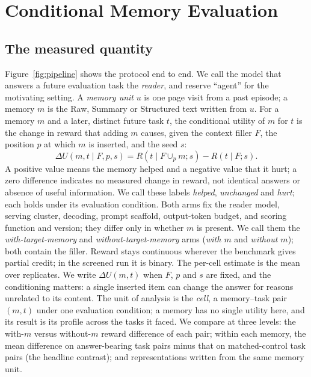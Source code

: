 \section{Conditional Memory Evaluation}
\label{sec:method}

\subsection{The measured quantity}
Figure~\ref{fig:pipeline} shows the protocol end to end. We call the model that answers a future evaluation task the \emph{reader},
and reserve ``agent'' for the motivating setting. A \emph{memory unit} $u$ is one
page visit from a past episode; a memory $m$ is the Raw, Summary or Structured
text written from $u$. For a memory $m$ and a later, distinct future task $t$, the conditional utility of
$m$ for $t$ is the change in reward that adding $m$ causes, given the context
filler $F$, the position $p$ at which $m$ is inserted, and the seed $s$:
\begin{equation}
\label{eq:du}
  \Delta U(m, t \mid F, p, s) = R(t \mid F \cup_p m; s) - R(t \mid F; s).
\end{equation}
A positive value means the memory helped and a negative value that it hurt; a
zero difference indicates no measured change in reward, not identical answers
or absence of useful information. We call these labels \emph{helped},
\emph{unchanged} and \emph{hurt}; each holds under its evaluation condition. Both arms fix the reader model, serving
cluster, decoding, prompt scaffold, output-token budget, and scoring function
and version; they differ only in whether $m$ is present. We call them the
\emph{with-target-memory} and \emph{without-target-memory} arms (\emph{with $m$} and
\emph{without $m$}); both contain the filler. Reward stays continuous
wherever the benchmark gives partial credit; in the screened run it is
binary. The per-cell estimate is the mean over replicates. We write $\Delta
U(m,t)$ when $F$, $p$ and $s$ are fixed, and the conditioning matters: a single
inserted item can change the answer for reasons unrelated to its content. The unit of analysis is the
\emph{cell}, a memory--task pair $(m,t)$ under one evaluation condition; a memory
has no single utility here, and its result is its profile across the tasks it
faced. We compare at three levels: the with-$m$ versus without-$m$ reward
difference of each pair; within each memory, the mean difference on
answer-bearing task pairs minus that on matched-control task pairs (the
headline contrast); and representations written from the same memory unit.


